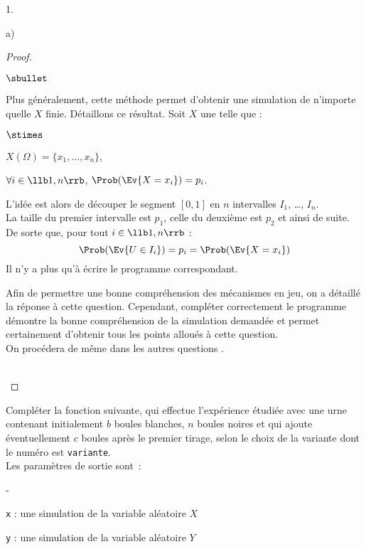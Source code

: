 \documentclass[11pt]{article}%
\begin{document}
\begin{noliste}{1.}
\begin{noliste}{a)}
\begin{proof}
\begin{remark}
\begin{noliste}{$\sbullet$}
      \item Plus généralement, cette méthode permet d'obtenir une
        simulation de n'importe quelle \var $X$ finie. Détaillons ce
        résultat. Soit $X$ une \var telle que :
        \begin{noliste}{$\stimes$}
        \item $X(\Omega) = \{ x_1, \ldots , x_n\}$,
        \item $\forall i \in \llb 1,n \rrb$, $\Prob(\Ev{X = x_i}) =
          p_i$.
        \end{noliste}
        L'idée est alors de découper le segment $[0, 1]$ en $n$
        intervalles $I_1$, \ldots, $I_n$.\\
        La taille du premier intervalle est $p_1$, celle du deuxième
        est $p_2$ et ainsi de suite.\\
        De sorte que, pour tout $i \in \llb 1, n \rrb$ :
        \[
        \Prob(\Ev{U \in I_i}) = p_i = \Prob(\Ev{X = x_i})
        \]
        Il n'y a plus qu'à écrire le programme correspondant.

      \item Afin de permettre une bonne compréhension des mécanismes
        en jeu, on a détaillé la réponse à cette question. Cependant,
        compléter correctement le programme \Scilab{} démontre la
        bonne compréhension de la simulation demandée et permet
        certainement d'obtenir tous les points alloués à cette
        question.\\
        On procédera de même dans les autres questions \Scilab{}.
        \end{noliste}        
      \end{remark}~\\[-1.4cm]
    \end{proof}


    \newpage


  \item Compléter la fonction suivante, qui effectue l'expérience
    étudiée avec une urne contenant initialement $b$ boules blanches,
    $n$ boules noires et qui ajoute éventuellement $c$ boules après le
    premier tirage,
    selon le choix de la variante dont le numéro est \texttt{variante}.\\
    Les paramètres de sortie sont~:
    \begin{noliste}{-}
    \item \texttt{x} : une simulation de la variable aléatoire $X$
    \item \texttt{y} : une simulation de la variable aléatoire $Y$
    \end{noliste}


\end{noliste}
\end{noliste}
\end{document}
